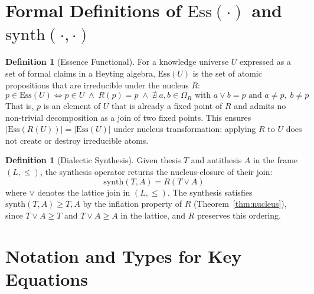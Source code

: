 \documentclass[11pt,a4paper]{article}
\theoremstyle{plain}
\theoremstyle{definition}
\newtheorem{definition}[theorem]{Definition}
\theoremstyle{remark}
\begin{document}
\section{Formal Definitions of \texorpdfstring{$\mathrm{Ess}(\cdot)$}{Ess} and \texorpdfstring{$\mathrm{synth}(\cdot,\cdot)$}{synth}}
\label{app:definitions}

\begin{definition}[Essence Functional]
For a knowledge universe $U$ expressed as a set of formal claims in a Heyting algebra,
$\mathrm{Ess}(U)$ is the set of atomic propositions that are irreducible under the nucleus $R$:
\[
  p \in \mathrm{Ess}(U) \iff p \in U \;\wedge\; R(p) = p \;\wedge\;
  \nexists\; a,b \in \Omega_R \text{ with } a \vee b = p
  \text{ and } a \neq p,\; b \neq p
\]
That is, $p$ is an element of $U$ that is already a fixed point of $R$ and admits no non-trivial
decomposition as a join of two fixed points. This ensures $|\mathrm{Ess}(R(U))| = |\mathrm{Ess}(U)|$
under nucleus transformation: applying $R$ to $U$ does not create or destroy irreducible atoms.
\end{definition}

\begin{definition}[Dialectic Synthesis]
Given thesis $T$ and antithesis $A$ in the frame $(L, \leq)$, the synthesis operator returns the
nucleus-closure of their join:
\[
  \mathrm{synth}(T, A) = R(T \vee A)
\]
where $\vee$ denotes the lattice join in $(L, \leq)$.  The synthesis satisfies
$\mathrm{synth}(T, A) \geq T, A$ by the inflation property of $R$ (Theorem~\ref{thm:nucleus}),
since $T \vee A \geq T$ and $T \vee A \geq A$ in the lattice, and $R$ preserves this ordering.
\end{definition}

\section{Notation and Types for Key Equations}
\label{app:notation}
\end{document}

